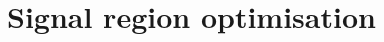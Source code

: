 

\chapter{Signal region optimisation}

\ifpdf
    \graphicspath{{chapter-optimisation/Figs/Raster/}{chapter-optimisation/Figs/PDF/}{chapter-optimisation/Figs/}}
\else
    \graphicspath{{chapter-optimisation/Figs/Vector/}{chapter-optimisation/Figs/}}
\fi


